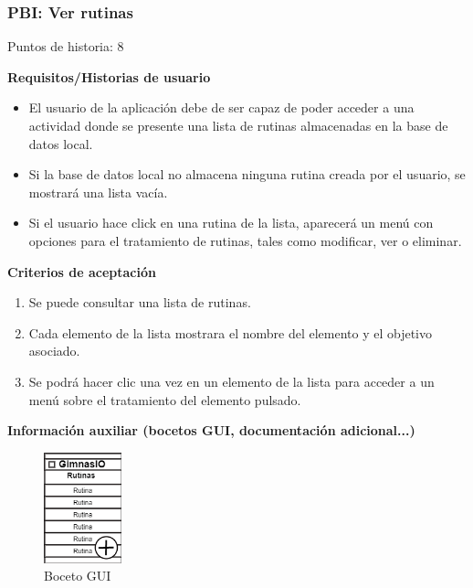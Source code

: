 \documentclass[11pt,a4paper]{report}
\begin{document}
\subsubsection{PBI: Ver rutinas}
Puntos de historia: 8
\par\textbf{Requisitos/Historias de usuario}
\begin{itemize}
	\item El usuario de la aplicación debe de ser capaz de poder acceder a una actividad donde se presente una lista de rutinas almacenadas en la base de datos local.
	\item Si la base de datos local no almacena ninguna rutina creada por el usuario, se mostrará una lista vacía.
	\item Si el usuario hace click en una rutina de la lista, aparecerá un menú con opciones para el tratamiento de rutinas, tales como modificar, ver o eliminar.
\end{itemize}
\par\textbf{Criterios de aceptación}
\begin{enumerate}
	\item Se puede consultar una lista de rutinas.
	\item Cada elemento de la lista mostrara el nombre del elemento y el objetivo
	asociado.
	\item Se podrá hacer clic una vez en un elemento de la lista para acceder a un menú sobre el tratamiento del elemento pulsado.
\end{enumerate}
\par\textbf{Información auxiliar (bocetos GUI, documentación adicional...)}
\begin{figure}[H]
	\centering
	\includegraphics[width=0.2\textwidth]{capturicas/guipbiverrutinas.png}
	\caption{Boceto GUI}
	\label{fig: guipbi4}
\end{figure}
\end{document}
